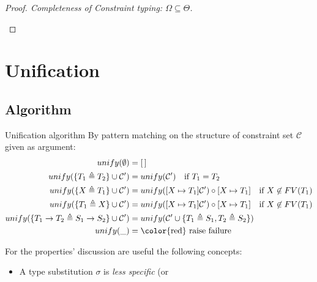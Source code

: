 \documentclass[8pt]{beamer}
\begin{document}
\begin{frame}
\begin{proof}[Proof. Completeness of Constraint typing: 
        $\Omega \subseteq \Theta$]
\begin{description}
        \end{description}
    \end{proof}
    \normalsize
\end{frame}

\section{Unification}
\subsection{Algorithm}
\begin{frame}
    \begin{block}{Unification algorithm}
        By pattern matching on the structure of constraint set $\mathcal{C}$
        given as argument:
        \begin{displaymath}
            \begin{split}
                unify(\emptyset) &= [\,] \\
                unify(\{T_1 \triangleq T_2\} \cup \mathcal{C}^{\prime}) &=
                    unify(\mathcal{C}^{\prime})
                    \quad \text{if } T_1 = T_2\\
                unify(\{X \triangleq T_1\} \cup \mathcal{C}^{\prime}) &=
                    unify([ X \mapsto T_1]\mathcal{C}^{\prime}) \circ [X \mapsto T_1]
                    \quad \text{if } X \not \in FV(T_1)\\
                unify(\{T_1 \triangleq X\} \cup \mathcal{C}^{\prime}) &=
                    unify([ X \mapsto T_1]\mathcal{C}^{\prime}) \circ [X \mapsto T_1]
                    \quad \text{if } X \not \in FV(T_1)\\
                unify(\{T_1 \rightarrow T_2 \triangleq S_1\rightarrow S_2 \} 
                    \cup \mathcal{C}^{\prime}) &=
                    unify(\mathcal{C}^{\prime} \cup \{T_1 \triangleq S_1,
                        T_2 \triangleq S_2\}) \\
                unify(\_) &= \text{\color{red} raise failure}\\
            \end{split}
        \end{displaymath}
    \end{block}
    \pause
    For the properties' discussion are useful the following concepts:
    \begin{itemize}
        \item   A type substitution $\sigma$ is \emph{less specific} (or 

\end{itemize}
\end{frame}
\end{document}
